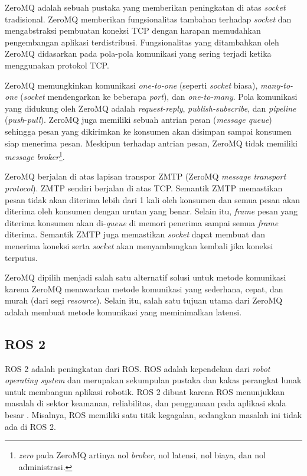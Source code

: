 ZeroMQ adalah sebuah pustaka yang memberikan pe\-ning\-ka\-tan di atas
\textit{socket} tradisional. ZeroMQ memberikan fungsionalitas tambahan terhadap
\textit{socket} dan mengabstraksi pembuatan koneksi TCP dengan harapan
memudahkan pengembangan aplikasi terdistribusi. Fungsionalitas yang ditambahkan
oleh ZeroMQ didasarkan pada pola-pola komunikasi yang sering terjadi ketika
menggunakan protokol TCP.

ZeroMQ memungkinkan komunikasi \textit{one-to-one} (seperti \textit{socket}
biasa), \textit{many-to-one} (\textit{socket} mendengarkan ke beberapa
\textit{port}), dan \textit{one-to-many}. Pola komunikasi yang didukung oleh
ZeroMQ adalah \textit{request-reply}, \textit{publish-subscribe}, dan
\textit{pipeline} (\textit{push}-\textit{pull}). ZeroMQ juga memiliki sebuah
antrian pesan (\textit{message queue}) sehingga pesan yang dikirimkan ke
konsumen akan disimpan sampai konsumen siap menerima pesan. Meskipun terhadap
antrian pesan, ZeroMQ tidak memiliki \textit{message
broker}\footnote{\textit{zero} pada ZeroMQ artinya nol \textit{broker}, nol
latensi, nol biaya, dan nol administrasi.}.

ZeroMQ berjalan di atas lapisan transpor ZMTP (ZeroMQ \textit{message transport
    protocol}). ZMTP sendiri berjalan di atas TCP. Semantik ZMTP memastikan
pesan tidak akan diterima lebih dari 1 kali oleh konsumen dan semua pesan
akan diterima oleh konsumen dengan urutan yang benar. Selain itu,
\textit{frame} pesan yang diterima konsumen akan di-\textit{queue} di memori
penerima sampai semua \textit{frame} diterima. Semantik ZMTP juga memastikan
\textit{socket} dapat membuat dan menerima koneksi serta \textit{socket}
akan menyambungkan kembali jika koneksi terputus.

ZeroMQ dipilih menjadi salah satu alternatif solusi untuk metode komunikasi
karena ZeroMQ menawarkan metode komunikasi yang sederhana, cepat, dan murah
(dari segi \textit{resource}). Selain itu, salah satu tujuan utama dari ZeroMQ
adalah membuat metode komunikasi yang meminimalkan latensi.

\subsection{ROS 2}

ROS 2 adalah peningkatan dari ROS. ROS adalah kependekan dari \textit{robot
    operating system} dan merupakan sekumpulan pustaka dan kakas perangkat lunak
untuk membangun aplikasi robotik. ROS 2 dibuat karena ROS menunjukkan masalah di
sektor keamanan, reliabilitas, dan penggunaan pada aplikasi skala besar
\parencite{doi:10.1126/scirobotics.abm6074_ros}. Misalnya, ROS memiliki satu
titik kegagalan, sedangkan masalah ini tidak ada di ROS 2.

